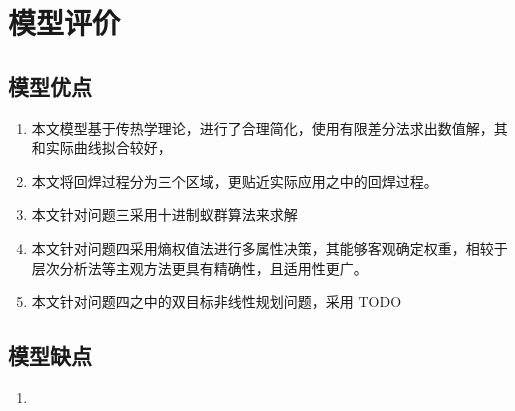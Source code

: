 \section{模型评价}
\subsection{模型优点}
\begin{enumerate}
\item 本文模型基于传热学理论，进行了合理简化，使用有限差分法求出数值解，其和实际曲线拟合较好，
\item 本文将回焊过程分为三个区域，更贴近实际应用之中的回焊过程。
\item 本文针对问题三采用十进制蚁群算法来求解
\item 本文针对问题四采用熵权值法进行多属性决策，其能够客观确定权重，相较于层次分析法等主观方法更具有精确性，且适用性更广。
\item 本文针对问题四之中的双目标非线性规划问题，采用 TODO
\end{enumerate}

\subsection{模型缺点}
\begin{enumerate}
\item 
\end{enumerate}
